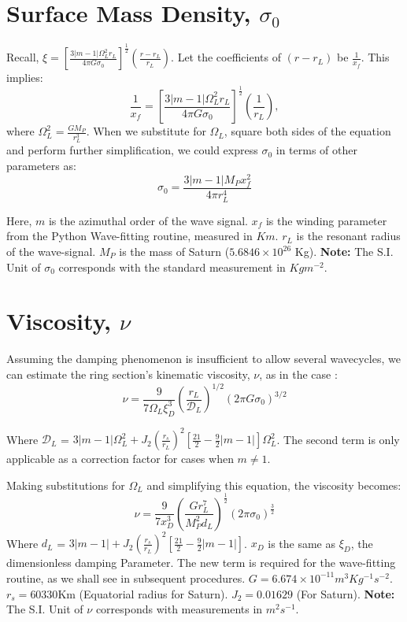 \documentclass{article}
\begin{document}
\section{Surface Mass Density, $\sigma_{0}$}
Recall, $\xi = \left[\frac{3|m-1|\Omega_{L}^{2}r_{L}}{4\pi G \sigma_{0}}\right]^{\frac{1}{2}}\left(\frac{r-r_{L}}{r_{L}}\right)$. Let the coefficients of $(r-r_{L})$ be $\frac{1}{x_{f}}$. This implies:
\begin{equation}
 \frac{1}{x_{f}} = \left[\frac{3|m-1|\Omega_{L}^{2}r_{L}}{4\pi G \sigma_{0}}\right]^{\frac{1}{2}}\left(\frac{1}{r_{L}}\right),
\end{equation}
where $\Omega_{L}^{2} = \frac{G M_{P}}{r_{L}^{3}}$. When we substitute for $\Omega_{L}$, square both sides of the equation and perform further simplification, we could express $\sigma_{0}$ in terms of other parameters as:
\begin{equation}
 \sigma_{0} = \frac{3 |m-1| M_{P}x_{f}^{2}}{4\pi r_{L}^{4}}
\end{equation}

Here, $m$ is the azimuthal order of the wave signal. $x_{f}$ is the winding parameter from the Python Wave-fitting routine, measured in $Km$.  $r_{L}$ is the resonant radius of the wave-signal.  $M_{P}$ is the mass of Saturn ($5.6846 \times 10^{26}$ Kg). \textbf{Note:} The S.I. Unit of $\sigma_{0}$ corresponds with the standard measurement in $Kgm^{-2}$.


\section{Viscosity, $\nu$}
Assuming the damping phenomenon is insufficient to allow several wavecycles, we can estimate the ring section's kinematic viscosity, $\nu$, as in the case \cite{GOLDREICH1978240}\cite{1984prin.conf..513S}\cite{Tiscareno_2007}:
\begin{equation}
    \nu = \frac{9}{7\Omega_{L}\xi_{D}^{3}}\left(\frac{r_{L}}{\mathcal{D}_{L}}\right)^{1/2}(2\pi G \sigma_{0})^{3/2}
\end{equation}
 
 Where $\mathcal{D}_{L}$ = $3|m-1|\Omega_{L}^{2} + J_{2}(\frac{r_{s}}{r_{L}})^{2}[\frac{21}{2}-\frac{9}{2}|m-1|]\Omega_{L}^{2}$. The second term is only applicable as a correction factor for cases when $m \neq 1$.

Making substitutions for $\Omega_{L}$ and simplifying this equation, the viscosity becomes: 
\begin{equation}
    \nu = \frac{9}{7 x_{D}^{3}}(\frac{Gr_{L}^{7}}{M_{P}^{2}d_{L}})^{\frac{1}{2}}(2\pi\sigma_{0})^{\frac{3}{2}}
\end{equation}
 Where $d_{L}$ = $3|m-1| + J_{2}(\frac{r_{s}}{r_{L}})^{2}[\frac{21}{2}-\frac{9}{2}|m-1|]$. $x_{D}$ is the same as $\xi_{D}$, the dimensionless damping Parameter. The new term is required for the wave-fitting routine, as we shall see in subsequent procedures. $G = 6.674 \times 10^{-11}m^{3} Kg^{-1} s^{-2}$. $r_{s} = 60330$Km (Equatorial radius for Saturn). $J_{2} = 0.01629$ (For Saturn). \textbf{Note:} The S.I. Unit of $\nu$ corresponds with measurements in $m^{2}s^{-1}$.
\end{document}
